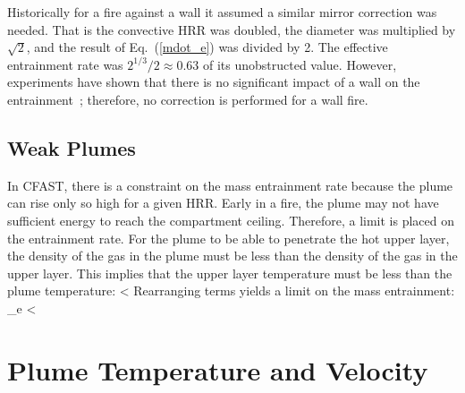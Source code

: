 \documentclass[12pt,twoside]{book}
\begin{document}
Historically for a fire against a wall it assumed a similar mirror correction was needed. That is the convective HRR was doubled, the diameter was multiplied by $\sqrt{2}$, and the result of Eq.~(\ref{mdot_e}) was divided by 2. The effective entrainment rate was $2^{1/3}/2 \approx 0.63$ of its unobstructed value. However, experiments have shown that there is no significant impact of a wall on the entrainment~\cite{McGrattan:TN1984}; therefore, no correction is performed for a wall fire.

\subsection{Weak Plumes}

In CFAST, there is a constraint on the mass entrainment rate because the plume can rise only so high for a given HRR.  Early in a fire, the plume may not have sufficient energy to reach the compartment ceiling. Therefore, a limit is placed on the entrainment rate. For the plume to be able to penetrate the hot upper layer, the density of the gas in the plume must be less than the density of the gas in the upper layer. This implies that the upper layer temperature must be less than the plume temperature:
\be
   \Tu < \Tp \approx \frac{ \dQc + \dme \, \cp \, \Tl }{ \dme \, \cp}
\ee
Rearranging terms yields a limit on the mass entrainment:
\be
   \dm_e < \frac{\dQc}{\cp (\Tu - \Tl)}
\ee


\section{Plume Temperature and Velocity}
\label{sec:Plume_Temp_Velocity}
\end{document}
